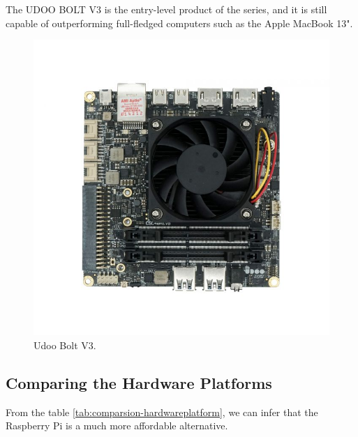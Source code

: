 The UDOO BOLT V3 is the entry-level product of the series, and it is still capable of outperforming full-fledged computers such as the Apple MacBook 13".

\begin{figure}[H]
    \centering
    \includegraphics[width=0.5\linewidth]{images/udoobolt-image.jpg}
    \caption{Udoo Bolt V3.}
    \label{fig:udoobolt-image}
\end{figure}

\subsection{Comparing the Hardware Platforms}

From the table \ref{tab:comparsion-hardwareplatform}, we can infer that the Raspberry Pi is a much more affordable alternative.


